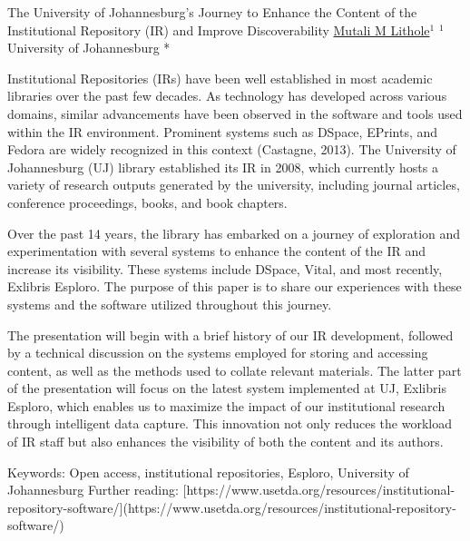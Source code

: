 \begin{abstract_online}{The University of Johannesburg’s Journey to Enhance the Content of the Institutional Repository (IR) and Improve Discoverability}{%
    \underline{Mutali M Lithole}$^{1}$}{%
    }{%
    $^1$ University of Johannesburg *\newline{}
}

Institutional Repositories (IRs) have been well established in most academic libraries over the past few decades. As technology has developed across various domains, similar advancements have been observed in the software and tools used within the IR environment. Prominent systems such as DSpace, EPrints, and Fedora are widely recognized in this context (Castagne, 2013). The University of Johannesburg (UJ) library established its IR in 2008, which currently hosts a variety of research outputs generated by the university, including journal articles, conference proceedings, books, and book chapters.

Over the past 14 years, the library has embarked on a journey of exploration and experimentation with several systems to enhance the content of the IR and increase its visibility. These systems include DSpace, Vital, and most recently, Exlibris Esploro. The purpose of this paper is to share our experiences with these systems and the software utilized throughout this journey. 

The presentation will begin with a brief history of our IR development, followed by a technical discussion on the systems employed for storing and accessing content, as well as the methods used to collate relevant materials. The latter part of the presentation will focus on the latest system implemented at UJ, Exlibris Esploro, which enables us to maximize the impact of our institutional research through intelligent data capture. This innovation not only reduces the workload of IR staff but also enhances the visibility of both the content and its authors.

Keywords: Open access, institutional repositories, Esploro, University of Johannesburg  
Further reading: [https://www.usetda.org/resources/institutional-repository-software/](https://www.usetda.org/resources/institutional-repository-software/)
\end{abstract_online}

